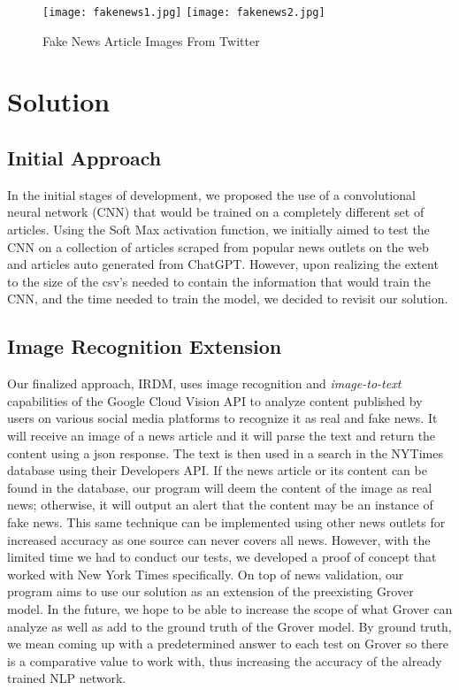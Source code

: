 \documentclass[conference]{IEEEtran}
\begin{document}
\begin{figure}
\centering
    \texttt{[image: fakenews1.jpg]}
    \texttt{[image: fakenews2.jpg]}
    \caption{Fake News Article Images From Twitter}
\label{fig:fakenews1}
\end{figure}

\section{Solution}

\subsection{Initial Approach}

In the initial stages of development, we proposed the use of a convolutional neural network (CNN) that would be trained on a completely different set of articles. Using the Soft Max activation function, we initially aimed to test the CNN on a collection of articles scraped from popular news outlets on the web and articles auto generated from ChatGPT. However, upon realizing the extent to the size of the csv's needed to contain the information that would train the CNN, and the time needed to train the model, we decided to revisit our solution. 


\subsection{Image Recognition Extension}

Our finalized approach, IRDM, uses image recognition and \emph{image-to-text} capabilities of the Google Cloud Vision API to analyze content published by users on various social media platforms to recognize it as real and fake news. It will receive an image of a news article and it will parse the text and return the content using a json response. The text is then used in a search in the NYTimes database using their Developers API. If the news article or its content can be found in the database, our program will deem the content of the image as real news; otherwise, it will output an alert that the content may be an instance of fake news. This same technique can be implemented using other news outlets for increased accuracy as one source can never covers all news. However, with the limited time we had to conduct our tests, we developed a proof of concept that worked with New York Times specifically. On top of news validation, our program aims to use our solution as an extension of the preexisting Grover model. In the future, we hope to be able to increase the scope of what Grover can analyze as well as add to the ground truth of the Grover model. By ground truth, we mean coming up with a predetermined answer to each test on Grover so there is a comparative value to work with, thus increasing the accuracy of the already trained NLP network. 
\end{document}
